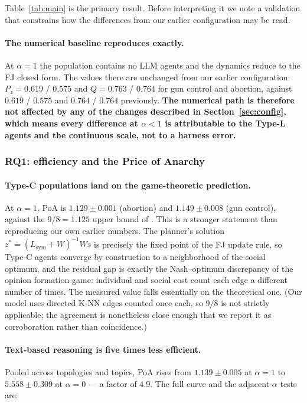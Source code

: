Table~\ref{tab:main} is the primary result. Before interpreting it we note a validation
that constrains how the differences from our earlier configuration may be read.

\paragraph{The numerical baseline reproduces exactly.}
At $\alpha = 1$ the population contains no LLM agents and the dynamics reduce to the FJ
closed form. The values there are unchanged from our earlier configuration:
$P_z = 0.619$ / $0.575$ and $Q = 0.763$ / $0.764$ for gun control and abortion, against
$0.619$ / $0.575$ and $0.764$ / $0.764$ previously. \textbf{The numerical path is
therefore not affected by any of the changes described in Section~\ref{sec:config},
which means every difference at $\alpha < 1$ is attributable to the Type-L agents and
the continuous scale, not to a harness error.}

\subsubsection{RQ1: efficiency and the Price of Anarchy}
\label{sec:res-rq1}

\paragraph{Type-C populations land on the game-theoretic prediction.}
At $\alpha = 1$, PoA is $1.129 \pm 0.001$ (abortion) and $1.149 \pm 0.008$ (gun control),
against the $9/8 = 1.125$ upper bound of \citet{bhawalkar2013coevolutionary}. This is a
stronger statement than reproducing our own earlier numbers. The planner's solution
$z^* = (L_{\mathrm{sym}} + W)^{-1} W s$ is precisely the fixed point of the FJ update
rule, so Type-C agents converge by construction to a neighborhood of the social optimum,
and the residual gap is exactly the Nash--optimum discrepancy of the opinion formation
game: individual and social cost count each edge a different number of times. The
measured value falls essentially on the theoretical one. (Our model uses directed K-NN
edges counted once each, so $9/8$ is not strictly applicable; the agreement is
nonetheless close enough that we report it as corroboration rather than coincidence.)

\paragraph{Text-based reasoning is five times less efficient.}
Pooled across topologies and topics, PoA rises from $1.139 \pm 0.005$ at $\alpha = 1$ to
$5.558 \pm 0.309$ at $\alpha = 0$ --- a factor of 4.9. The full curve and the
adjacent-$\alpha$ tests are:

